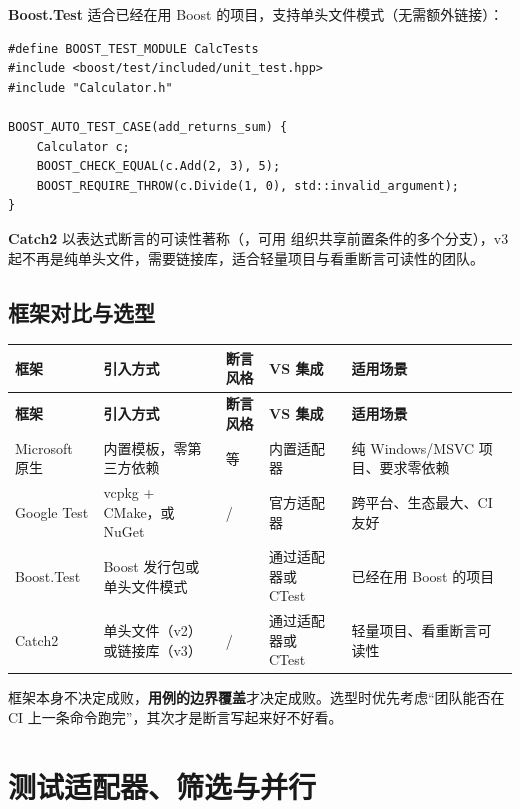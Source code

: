 \textbf{Boost.Test} 适合已经在用 Boost 的项目，支持单头文件模式（无需额外链接）：

\begin{lstlisting}[style=cppstyle]
#define BOOST_TEST_MODULE CalcTests
#include <boost/test/included/unit_test.hpp>
#include "Calculator.h"

BOOST_AUTO_TEST_CASE(add_returns_sum) {
    Calculator c;
    BOOST_CHECK_EQUAL(c.Add(2, 3), 5);
    BOOST_REQUIRE_THROW(c.Divide(1, 0), std::invalid_argument);
}
\end{lstlisting}

\textbf{Catch2} 以表达式断言的可读性著称（，可用  组织共享前置条件的多个分支），v3 起不再是纯单头文件，需要链接库，适合轻量项目与看重断言可读性的团队。

\subsection{框架对比与选型}

\begin{longtable}{L{2.4cm}L{3.8cm}L{4.1cm}L{1.6cm}L{1.9cm}}
\toprule \textbf{框架} & \textbf{引入方式} & \textbf{断言风格} & \textbf{VS 集成} & \textbf{适用场景} \\ \midrule
\endfirsthead
\toprule \textbf{框架} & \textbf{引入方式} & \textbf{断言风格} & \textbf{VS 集成} & \textbf{适用场景} \\ \midrule
\endhead
\bottomrule \endlastfoot
Microsoft 原生 & 内置模板，零第三方依赖 & \allowbreak{} 等 & 内置适配器 & 纯 Windows/MSVC 项目、要求零依赖 \\
Google Test & vcpkg + CMake，或 NuGet &  /  & 官方适配器 & 跨平台、生态最大、CI 友好 \\
Boost.Test & Boost 发行包或单头文件模式 &  & 通过适配器或 CTest & 已经在用 Boost 的项目 \\
Catch2 & 单头文件（v2）或链接库（v3） &  /  & 通过适配器或 CTest & 轻量项目、看重断言可读性 \\
\end{longtable}

\begin{tipbox}[提示]
框架本身不决定成败，\textbf{用例的边界覆盖}才决定成败。选型时优先考虑“团队能否在 CI 上一条命令跑完”，其次才是断言写起来好不好看。
\end{tipbox}

\section{测试适配器、筛选与并行}

